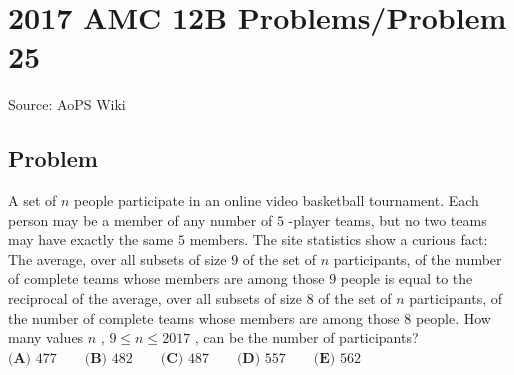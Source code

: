 \documentclass[12pt]{article}
\begin{document}
\section*{{2017 AMC 12B Problems/Problem 25}}
Source: AoPS Wiki

\subsection*{Problem}
A set of $n$ people participate in an online video basketball tournament. Each person may be a member of any number of $5$ -player teams, but no two teams may have exactly the same $5$ members. The site statistics show a curious fact: The average, over all subsets of size $9$ of the set of $n$ participants, of the number of complete teams whose members are among those $9$ people is equal to the reciprocal of the average, over all subsets of size $8$ of the set of $n$ participants, of the number of complete teams whose members are among those $8$ people. How many values $n$ , $9\leq n\leq 2017$ , can be the number of participants? $\textbf{(A) } 477 \qquad \textbf{(B) } 482 \qquad \textbf{(C) } 487 \qquad \textbf{(D) } 557 \qquad \textbf{(E) } 562$
\end{document}
